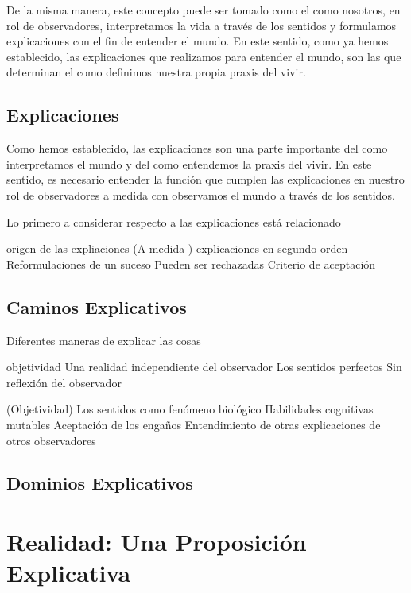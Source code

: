 \documentclass[10pt]{article}
\begin{document}
        De la misma manera, este concepto puede ser tomado como el como nosotros, en rol de observadores, interpretamos la vida a través de los sentidos y formulamos explicaciones con el fin de entender el mundo. En este sentido, como ya hemos establecido, las explicaciones que realizamos para entender el mundo, son las que determinan el como definimos nuestra propia praxis del vivir. 

        \subsection{Explicaciones}

        Como hemos establecido, las explicaciones son una parte importante del como interpretamos el mundo y del como entendemos la praxis del vivir. En este sentido, es necesario entender la función que cumplen las explicaciones en nuestro rol de observadores a medida con observamos el mundo a través de los sentidos. 

        Lo primero a considerar respecto a las explicaciones está relacionado
        
        origen de las expliaciones (A medida )
        explicaciones en segundo orden
        Reformulaciones de un suceso 
        Pueden ser rechazadas 
        Criterio de aceptación

        \subsection{Caminos Explicativos}

        Diferentes maneras de explicar las cosas

        objetividad 
            Una realidad independiente del observador
            Los sentidos perfectos
            Sin reflexión del observador 

        (Objetividad)
            Los sentidos como fenómeno biológico
            Habilidades cognitivas mutables
            Aceptación de los engaños
            Entendimiento de otras explicaciones de otros observadores



        \subsection{Dominios Explicativos}

    \section{Realidad: Una Proposición Explicativa}
\end{document}
